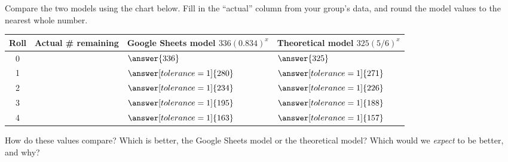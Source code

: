 \documentclass[12pt]{ximera}
\begin{document}
\begin{problem}
Compare the two models using the chart below. Fill in the ``actual'' column from your
group's data, and round the model values to the nearest whole number.

\begin{center}
\begin{tabular}{|c|l|l|l|}
\hline
Roll & Actual \# remaining & Google Sheets model $336(0.834)^{x}$ & Theoretical model $325(5/6)^{x}$ \\
\hline
0 & & $\answer{336}$ & $\answer{325}$ \\
\hline
1 & & $\answer[tolerance=1]{280}$ & $\answer[tolerance=1]{271}$ \\
\hline
2 & & $\answer[tolerance=1]{234}$ & $\answer[tolerance=1]{226}$ \\
\hline
3 & & $\answer[tolerance=1]{195}$ & $\answer[tolerance=1]{188}$ \\
\hline
4 & & $\answer[tolerance=1]{163}$ & $\answer[tolerance=1]{157}$ \\
\hline
\end{tabular}
\end{center}
\end{problem}

\begin{problem}
How do these values compare? Which is better, the Google Sheets model or the
theoretical model? Which would we \emph{expect} to be better, and why?

\begin{freeResponse}
\end{freeResponse}
\end{problem}
\end{document}
